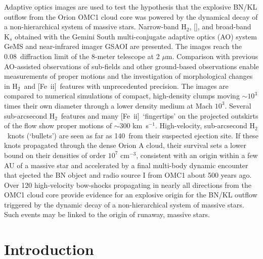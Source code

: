 \documentclass{aa}
\newcommand{\cmq}{cm{$^{-3}$}}
\newcommand{\kms}{km~s{$^{-1}$}}
\newcommand{\Feii}{[Fe~{\sc ii}]}
\newcommand{\mum}{\ensuremath{\mu \mathrm{m}}}
\newcommand{\hh}{\ensuremath{\textrm{H}_{2}}}			%
\newcommand{\feii}{\ion{Fe}{2}}		%
\begin{document}
\abstract
{}
{Adaptive optics images are used to test the hypothesis
that the explosive  BN/KL outflow from the Orion OMC1 cloud 
core was powered by the dynamical decay of a non-hierarchical
system of massive stars.  }
{
Narrow-band \hh ,  [\feii], and broad-band K$_s$ obtained with the Gemini 
South multi-conjugate adaptive optics (AO) system GeMS and near-infrared 
imager GSAOI are presented.   
The images reach the 0.08\arcsec\ diffraction limit of the 8-meter 
telescope at 2 \mum.  Comparison with previous AO-assisted observations of 
sub-fields and other ground-based observations enable measurements of proper 
motions and the investigation of morphological changes in  \hh\ and \Feii\ features 
with  unprecedented precision.   The images are compared to numerical simulations of 
compact, high-density clumps moving $\sim 10^3$ times their own
diameter through a lower density medium at Mach $10^3$. 
}
{
Several sub-arcsecond \hh\ features and many \Feii\ `fingertips' on the 
projected outskirts of the flow show 
proper motions of $\sim$300 \kms.    High-velocity,  
sub-arcsecond   \hh\  knots (`bullets')  
are seen as far as 140\arcsec\ from their suspected ejection site.    
If these knots propagated through the dense  Orion A 
cloud, their survival  sets  a lower bound on their densities of order $10^7$ \cmq ,  
consistent with an origin within a few AU of a massive star and accelerated
by a final multi-body dynamic encounter  that ejected  
the BN  object and radio source I from OMC1 about 500 years ago.  
}
{
Over 120 high-velocity bow-shocks propagating in nearly all 
directions from the OMC1 cloud core provide evidence for an explosive 
origin for the BN/KL outflow triggered by the dynamic decay of a non-hierarchical
system of massive stars.   Such events may be linked to the origin of 
runaway, massive stars. 
}

\maketitle

\section{Introduction} 
\end{document}
